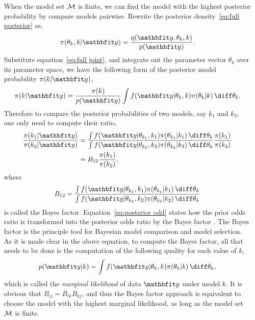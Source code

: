 When the model set $\mathcal{M}$ is finite, we can find the model with the highest
posterior probability by compare models pairwise. Rewrite the posterior
density~\eqref{eq:full posterior} as,
\begin{equation}
  \pi(\theta_k,k|\data) = \frac{\eta(\data,\theta_k,k)}{p(\data)}.
\end{equation}
Substitute equation~\eqref{eq:full joint}, and integrate out the parameter
vector $\theta_k$ over its parameter space, we have the following form of the
posterior model probability $\pi(k|\data)$,
\begin{equation}
  \pi(k|\data) = \frac{\pi(k)}{p(\data)}
  \int f(\data|\theta_k,k)\pi(\theta_k|k)\intd\theta_k.
\end{equation}
Therefore to compare the posterior probabilities of two models, say $k_1$ and
$k_2$, one only need to compute their ratio,
\begin{align}
  \frac{\pi(k_1|\data)}{\pi(k_2|\data)} &= \frac
  {\int f(\data|\theta_{k_1},k_1)\pi(\theta_{k_1}|k_1)\intd\theta_k}
  {\int f(\data|\theta_{k_2},k_2)\pi(\theta_{k_2}|k_2)\intd\theta_k}
  \frac{\pi(k_1)}{\pi(k_2)} \notag\\
  & = B_{12} \frac{\pi(k_1)}{\pi(k_2)},
  \label{eq:posterior odd}
\end{align}
where
\begin{equation}
  B_{12} = \frac
  {\int f(\data|\theta_{k_1},k_1)\pi(\theta_{k_1}|k_1)\intd\theta_k}
  {\int f(\data|\theta_{k_2},k_2)\pi(\theta_{k_2}|k_2)\intd\theta_k}
  \label{eq:bayes factor}
\end{equation}
is called the Bayes factor. Equation~\eqref{eq:posterior odd} states how the
prior odds ratio is transformed into the posterior odds ratio by the Bayes
factor \parencite{Kass:1995vb}. The Bayes factor is the principle tool for
Bayesian model comparison and model selection. As it is made clear in the
above equation, to compute the Bayes factor, all that needs to be done is the
computation of the following quality for each value of $k$,
\begin{equation}
  p(\data|k) = 
  \int f(\data|\theta_k,k)\pi(\theta_k|k)\intd\theta_k,
  \label{eq:marginal likelihood}
\end{equation}
which is called the \emph{marginal likelihood} of data $\data$ under model
$k$.  It is obvious that $B_{ij} = B_{ik} B_{kj}$, and thus the Bayes
factor approach is equivalent to choose the model with the highest marginal
likelihood, as long as the model set $\mathcal{M}$ is finite.

